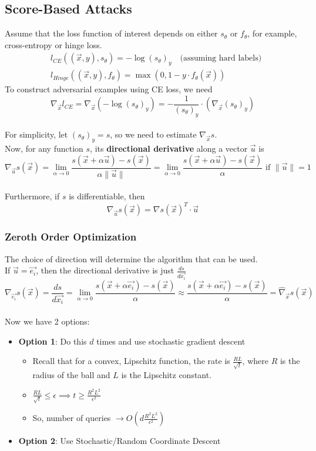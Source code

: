 \documentclass[11pt]{report}
\begin{document}
\subsection{Score-Based Attacks}
Assume that the loss function of interest depends on either $s_\theta$ or $f_\theta$, for example, cross-entropy or hinge loss.
\[
\begin{aligned}
    & l_{CE}((\vec{x}, y), s_\theta) = -\log(s_\theta)_y \quad \text{(assuming hard labels)} \\
    & l_{Hinge}((\vec{x}, y), f_\theta) = \max (0, 1-y \cdot f_\theta(\vec{x}))
\end{aligned}
\]
To construct adversarial examples using CE loss, we need
\[
    \nabla_{\vec{x}} l_{CE} = \nabla_{\vec{x}} (-\log(s_\theta)_y) = -\frac{1}{(s_\theta)_y} \cdot (\nabla_{\vec{x}} (s_\theta)_y)
\]
\\
For simplicity, let $(s_\theta)_y = s$, so we need to estimate $\nabla_{\vec{x}} s$.
\\
Now, for any function $s$, its \textbf{directional derivative} along a vector $\vec{u}$ is
\[
    \nabla_{\vec{u}} s(\vec{x}) = \lim_{\alpha \to 0} \frac{s(\vec{x}+\alpha\vec{u}) - s(\vec{x})}{\alpha\|\vec{u}\|} = \lim_{\alpha \to 0} \frac{s(\vec{x}+\alpha\vec{u}) - s(\vec{x})}{\alpha} \text{ if } \|\vec{u}\| = 1
\]
\\
Furthermore, if $s$ is differentiable, then
\[
     \nabla_{\vec{u}} s(\vec{x}) = \nabla s(\vec{x})^T \cdot \vec{u}
\]

\subsubsection*{Zeroth Order Optimization}

The choice of direction will determine the algorithm that can be used.\\
If $\vec{u} = \vec{e_i}$, then the directional derivative is just $\frac{ds}{d\vec{x_i}}$
\[
    \nabla_{\vec{e_i}} s(\vec{x}) = \frac{ds}{d\vec{x_i}} = \lim_{\alpha \to 0} \frac{s(\vec{x}+\alpha\vec{e_i}) - s(\vec{x})}{\alpha} \approx \frac{s(\vec{x}+\alpha\vec{e_i}) - s(\vec{x})}{\alpha} = \hat{\nabla}_{\vec{x}}s(\vec{x})
\]
\\
Now we have 2 options:
\begin{itemize}
    \item \textbf{Option 1}: Do this $d$ times and use stochastic gradient descent
    \begin{itemize}
        \item Recall that for a convex, Lipschitz function, the rate is $\frac{RL}{\sqrt{t}}$, where $R$ is the radius of the ball and $L$ is the Lipschitz constant.
        \item $\frac{RL}{\sqrt{t}} \leq \epsilon \implies t \geq \frac{R^2L^2}{\epsilon^2}$
        \item So, number of queries $\xrightarrow{} O(d\frac{R^2L^2}{\epsilon^2})$
    \end{itemize}
    \item \textbf{Option 2}: Use Stochastic/Random Coordinate Descent
\end{itemize}
\end{document}
